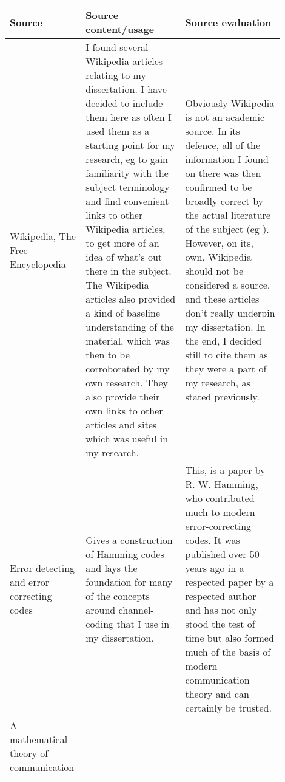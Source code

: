 \documentclass[a4paper,11pt]{article}
\begin{document}
    \begin{center}
    {
    \renewcommand{\arraystretch}{2.0}
    \begin{longtable}{p{0.2\linewidth} p{0.35\linewidth} p{0.35\linewidth}} \toprule
    Source & Source content/usage & Source evaluation \\ \midrule

    Wikipedia, The Free Encyclopedia
    \cite{WikiCRISPR,WikiCas9,WikiHadamardCode,WikiHadamardMatrix,WikiHammingCode,
          WikiHamming74,WikiBarcoding} &

    I found several Wikipedia articles relating to my dissertation. I have
    decided to include them here as often I used them as a starting point for my
    research, eg to gain familiarity with the subject terminology and find
    convenient links to other Wikipedia articles, to get more of an idea of
    what's out there in the subject. The Wikipedia articles also provided a kind
    of baseline understanding of the material, which was then to be corroborated
    by my own research. They also provide their own links to other articles and
    sites which was useful in my research. &

    Obviously Wikipedia is not an academic source. In its defence, all of the
    information I found on there was then confirmed to be broadly correct by
    the actual literature of the subject (eg
    \cite{Codes1950Hamming,Communication1948Shannon}). However, on its, own,
    Wikipedia should not be considered a source, and these articles don't really
    underpin my dissertation. In the end, I decided still to cite them as they
    were a part of my research, as stated previously. \\

    Error detecting and error correcting codes \cite{Codes1950Hamming} &

    Gives a construction of Hamming codes and lays the foundation for many of
    the concepts around channel-coding that I use in my dissertation. &

    This, is a paper by R. W. Hamming, who contributed much to modern
    error-correcting codes. It was published over 50 years ago in a respected
    paper by a respected author and has not only stood the test of time but
    also formed much of the basis of modern communication theory and can
    certainly be trusted.  \\

    A mathematical theory of communication \cite{Communication1948Shannon} &


\end{longtable}}
\end{center}
\end{document}
